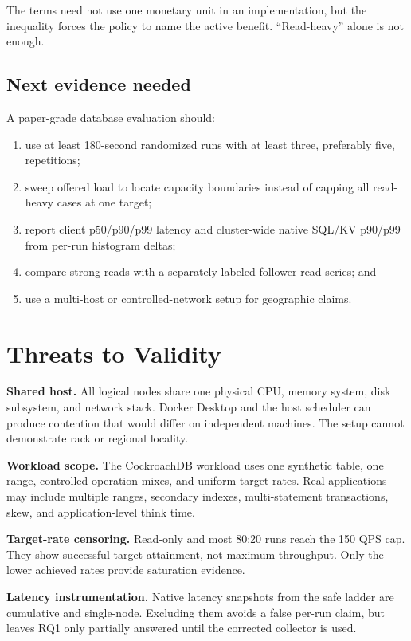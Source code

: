 \documentclass[a4paper,10pt,twocolumn]{article}
\newcommand{\cockroach}{CockroachDB}
\newcommand{\qps}{QPS}
\begin{document}
The terms need not use one monetary unit in an implementation, but the
inequality forces the policy to name the active benefit. ``Read-heavy'' alone
is not enough.

\subsection{Next evidence needed}

A paper-grade database evaluation should:

\begin{enumerate}
  \item use at least 180-second randomized runs with at least three, preferably
  five, repetitions;
  \item sweep offered load to locate capacity boundaries instead of capping
  all read-heavy cases at one target;
  \item report client p50/p90/p99 latency and cluster-wide native SQL/KV
  p90/p99 from per-run histogram deltas;
  \item compare strong reads with a separately labeled follower-read series;
  and
  \item use a multi-host or controlled-network setup for geographic claims.
\end{enumerate}

\section{Threats to Validity}
\label{sec:threats}

\textbf{Shared host.} All logical nodes share one physical CPU, memory system,
disk subsystem, and network stack. Docker Desktop and the host scheduler can
produce contention that would differ on independent machines. The setup cannot
demonstrate rack or regional locality.

\textbf{Workload scope.} The \cockroach{} workload uses one synthetic table,
one range, controlled operation mixes, and uniform target rates. Real
applications may include multiple ranges, secondary indexes, multi-statement
transactions, skew, and application-level think time.

\textbf{Target-rate censoring.} Read-only and most 80:20 runs reach the 150
\qps{} cap. They show successful target attainment, not maximum throughput.
Only the lower achieved rates provide saturation evidence.

\textbf{Latency instrumentation.} Native latency snapshots from the safe ladder
are cumulative and single-node. Excluding them avoids a false per-run claim,
but leaves RQ1 only partially answered until the corrected collector is used.
\end{document}
